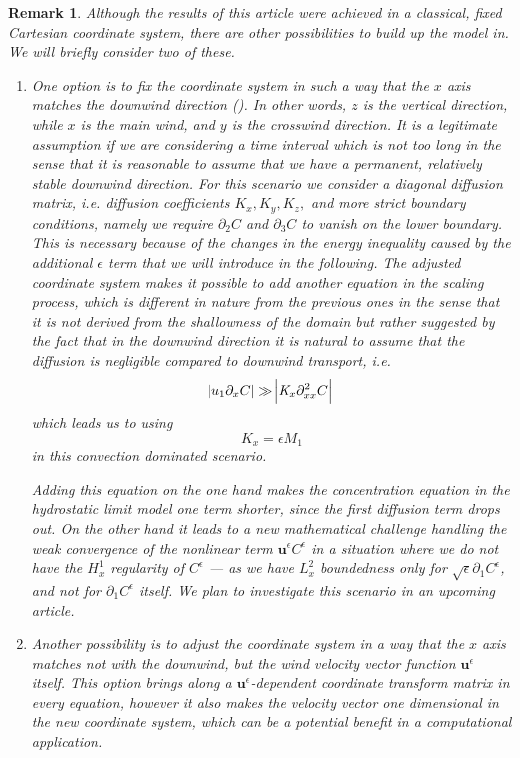 \documentclass[11pt]{article}
\newtheorem{remark}{Remark}
\begin{document}
\begin{remark}
\normalfont Although the results of this article were achieved in a classical, fixed Cartesian coordinate system, there are other possibilities to build up the model in. We will briefly consider two of these.

\begin{enumerate}
\item One option is to fix the coordinate system in such a way that the $x$ axis matches the downwind direction (\cite{goyal2011mathematical}). In other words, $z$ is the vertical direction, while $x$ is the main wind, and $y$ is the crosswind direction. It is a legitimate assumption if we are considering a time interval which is not too long in the sense that it is reasonable to assume that we have a permanent, relatively stable downwind direction. For this scenario we consider a diagonal diffusion matrix, i.e. diffusion coefficients $K_x, K_y, K_z,$ and more strict boundary conditions, namely we require $\partial_2 C$ and $\partial_3 C$ to vanish on the lower boundary. This is necessary because of the changes in the energy inequality caused by the additional $\epsilon$ term that we will introduce in the following. The adjusted coordinate system makes it possible to add another equation in the scaling process, which is different in nature from the previous ones in the sense that it is not derived from the shallowness of the domain but rather suggested by the fact that in the downwind direction it is natural to assume that the diffusion is negligible compared to downwind transport, i.e.
%
\begin{equation} \abs{u_1 \partial_x C} \gg \abs{ \textit{K}_{x} \partial_{xx} ^2 C }\end{equation}
%
which leads us to using
\[ K_x = \epsilon M_1 \]
in this convection dominated scenario.

Adding this equation on the one hand makes the concentration equation in the hydrostatic limit model one term shorter, since the first diffusion term drops out. On the other hand it leads to a new mathematical challenge handling the weak convergence of the nonlinear term $\mathbf{u}^\epsilon C^\epsilon$ in a situation where we do not have the $H^1_x$ regularity of $C^\epsilon$ --- as we have $L^2_x$ boundedness only for $\sqrt{\epsilon} \partial_1 C^\epsilon$, and not for $\partial_1 C^\epsilon$ itself. We plan to investigate this scenario in an upcoming article.

\item Another possibility is to adjust the coordinate system in a way that the $x$ axis matches not with the downwind, but the wind velocity vector function $\mathbf{u}^\epsilon$ itself. This option brings along a $\mathbf{u}^\epsilon$-dependent coordinate transform matrix in every equation, however it also makes the velocity vector one dimensional in the new coordinate system, which can be a potential benefit in a computational application.

\end{enumerate}

\end{remark}
\end{document}
